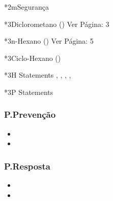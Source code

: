 \begin{sectionBox}*2m{Segurança}

    \begin{multicols}{2}

        \begin{sectionBox}*3{Diclorometano ()}
            Ver Página: 3
        \end{sectionBox}

        \begin{sectionBox}*3{n-Hexano ()}
            Ver Página: 5
        \end{sectionBox}

    \end{multicols}

    \begin{sectionBox}*3{Ciclo-Hexano ()}
        \begin{multicols}{2}

            \begin{sectionBox}{}
            \end{sectionBox}

            \begin{sectionBox}*3{H Statements}
                ,
                ,
                ,
                ,
            \end{sectionBox}

            \begin{sectionBox}*3{P Statements}
                \subsubsection*{P.Prevenção}
                \begin{itemize}
                    \item {}
                    \item {}
                \end{itemize}

                \subsubsection*{P.Resposta}
                \begin{itemize}
                    \item {}
                    \item {}
                \end{itemize}
            \end{sectionBox}


\end{multicols}
\end{sectionBox}
\end{sectionBox}
